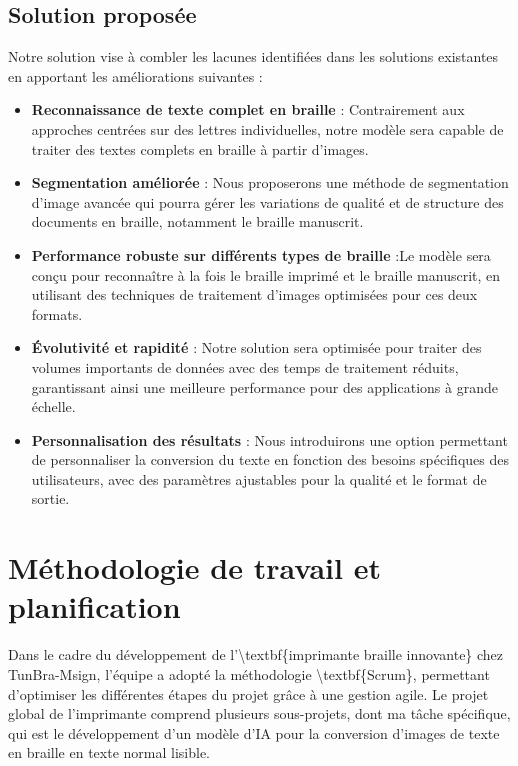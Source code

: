 \subsection{Solution proposée}

Notre solution vise à combler les lacunes identifiées dans les solutions existantes en apportant les améliorations suivantes : 

\begin{itemize}
    \item \textbf{Reconnaissance de texte complet en braille } : Contrairement aux approches centrées sur des lettres individuelles, notre modèle sera capable de traiter des textes complets en braille à partir d'images. 
    \item \textbf{Segmentation améliorée } : Nous proposerons une méthode de segmentation d'image avancée qui pourra gérer les variations de qualité et de structure des documents en braille, notamment le braille manuscrit.  
    \item \textbf{Performance robuste sur différents types de braille } :Le modèle sera conçu pour reconnaître à la fois le braille imprimé et le braille manuscrit, en utilisant des techniques de traitement d'images optimisées pour ces deux formats.  
    \item \textbf{Évolutivité et rapidité } : Notre solution sera optimisée pour traiter des volumes importants de données avec des temps de traitement réduits, garantissant ainsi une meilleure performance pour des applications à grande échelle. 
    \item \textbf{Personnalisation des résultats } : Nous introduirons une option permettant de personnaliser la conversion du texte en fonction des besoins spécifiques des utilisateurs, avec des paramètres ajustables pour la qualité et le format de sortie. 

\end{itemize}

\section{Méthodologie de travail et planification}

Dans le cadre du développement de l'\textbackslash{}textbf\{imprimante braille innovante\} chez TunBra-Msign, l'équipe a adopté la méthodologie \textbackslash{}textbf\{Scrum\}, permettant d'optimiser les différentes étapes du projet grâce à une gestion agile. Le projet global de l'imprimante comprend plusieurs sous-projets, dont ma tâche spécifique, qui est le développement d'un modèle d'IA pour la conversion d'images de texte en braille en texte normal lisible. 

